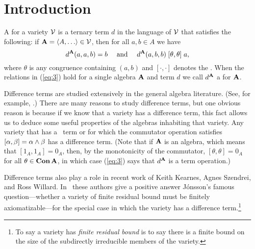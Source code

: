 \section{Introduction}
\label{sec:introduction}

A  for a variety $\mathcal{V}$ is a ternary term $d$ in the
language of $\mathcal{V}$ that satisfies the following:
if $\alg{A} = \<A, \dots \> \in \sV$, then for all $a, b \in A$ we have
\begin{equation}
\label{eq:3}
d^{\mathbf{A}}(a,a,b) = b \quad \text{ and } \quad
d^{\mathbf{A}}(a,b,b) \mathrel{[\theta, \theta]} a,
\end{equation}
where $\theta$ is any congruence %
containing $(a,b)$
and $[\cdot, \cdot]$ denotes the .
When the relations in (\ref{eq:3}) hold for a single algebra $\mathbf{A}$ and term $d$ we call $d^{\mathbf{A}}$
a  for $\mathbf{A}$.

Difference terms are studied extensively in the general algebra literature.
(See, for example, \cite{MR1358491,MR1663558,MR3076179,KSW,MR3449235}.)
There are many reasons to study difference terms, but
one obvious reason is because if we know that a variety
has a difference term, this fact allows us to deduce some useful
properties of the algebras inhabiting that variety.
Any variety that has a \malcev\ term or for which the commutator operation satisfies $[\alpha, \beta] = \alpha \meet \beta$ has a difference term.
(Note that if
$\mathbf{A}$ is an  algebra, which means
that $[1_A, 1_A] = 0_A$, then, by
the monotonicity of the commutator,
$[\theta, \theta] = 0_A$ for all $\theta \in \operatorname{\mathbf{Con}} \mathbf{A}$,
in which case %
(\ref{eq:3}) says that $d^{\mathbf{A}}$ is a \malcev term operation.)

Difference terms also play a role in recent work of Keith Kearnes,
Agnes Szendrei, and Ross Willard.
In~\cite{MR3449235} these authors give a positive answer
J\'onsson's famous question---whether a variety of finite
residual bound must be finitely
axiomatizable---for the
special case in which the variety has a difference
term.\footnote{To say a variety has \emph{finite residual bound} is to say
  there is a finite bound on the size of the subdirectly irreducible
  members of the variety.}

